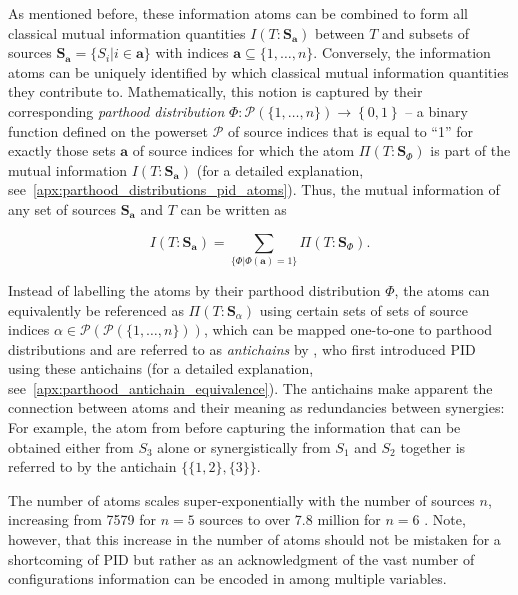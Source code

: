 \documentclass[10pt]{article}
\renewcommand\autoref[1]{\cref{#1}}
\theoremstyle{definition}
\theoremstyle{plain}
\begin{document}
As mentioned before, these information atoms can be combined to form all classical mutual information quantities $I(T:\bm S_{\bm{a}})$ between $T$ and subsets of sources $\bm{S}_{\bm{a}} = \{S_i|i \in \bm{a}\}$ with indices $\bm a \subseteq \{1, \dots, n\}$. Conversely, the information atoms can be uniquely identified by which classical mutual information quantities they contribute to. Mathematically, this notion is captured by their corresponding \textit{parthood distribution} $\Phi : \mathcal{P}(\{1, \dots, n\}) \to \left\{0, 1\right\}$ -- a binary function defined on the powerset $\mathcal{P}$ of source indices that is equal to ``1'' for exactly those sets $\bm a$ of source indices for which the atom $\Pi(T:\bm{S}_\Phi)$ is part of the mutual information $I(T:\bm S_{\bm a})$ \citep[Section 2]{gutknecht_bits_2021} (for a detailed explanation, see~\autoref{apx:parthood_distributions_pid_atoms}). Thus, the mutual information of any set of sources $\bm S_{\bm a}$ and $T$ can be written as 

\begin{equation}
    I(T:\bm S_{\bm a}) = \sum_{\{\Phi|\Phi(\bm a) = 1\}}\Pi(T:\bm{S}_\Phi).
    \label{eq:mi_decomposition_phi}
\end{equation}

Instead of labelling the atoms by their parthood distribution $\Phi$, the atoms can equivalently be referenced as $\Pi(T:\bm{S}_\alpha)$ using certain sets of sets of source indices $\alpha \in \mathcal{P}(\mathcal{P}(\{1, \dots, n\}))$, which can be mapped one-to-one to parthood distributions \citep{gutknecht_bits_2021} and are referred to as \textit{antichains} by \cite{williams_nonnegative_2010}, who first introduced PID using these antichains (for a detailed explanation, see~\autoref{apx:parthood_antichain_equivalence}). The antichains make apparent the connection between atoms and their meaning as redundancies between synergies: For example, the atom from before capturing the information that can be obtained either from $S_3$ alone or synergistically from $S_1$ and $S_2$ together is referred to by the antichain $\{\{1, 2\},\{3\}\}$.

The number of atoms scales super-exponentially with the number of sources $n$, increasing from 7579 for $n=5$ sources to over 7.8 million for $n=6$ \citep{williams_nonnegative_2010, wiedemann1991computation}. Note, however, that this increase in the number of atoms should not be mistaken for a shortcoming of PID but rather as an acknowledgment of the vast number of configurations information can be encoded in among multiple variables. 
\end{document}
